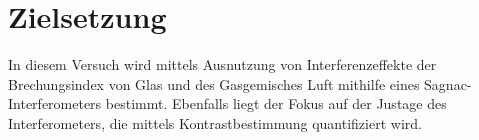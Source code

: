 \section{Zielsetzung}
\label{sec:Zielsetzung}
In diesem Versuch wird mittels Ausnutzung von Interferenzeffekte der Brechungsindex von Glas und des Gasgemisches Luft mithilfe eines Sagnac-Interferometers bestimmt.
Ebenfalls liegt der Fokus auf der Justage des Interferometers, die mittels Kontrastbestimmung quantifiziert wird.